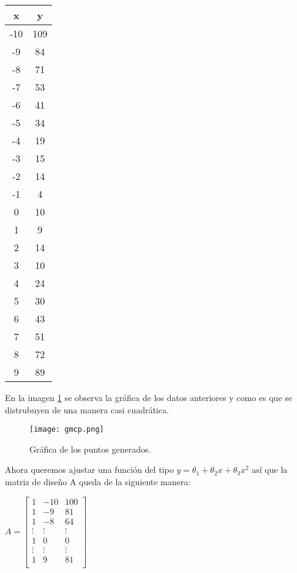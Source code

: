 \begin{center}
\begin{tabular}{|c|c| }
\hline
x & y \\
\hline
-10 & 109 \\
\hline
-9 & 84 \\
\hline
-8 & 71 \\ 
\hline  
-7 & 53 \\
\hline
-6 & 41 \\ 
\hline
-5 & 34 \\ 
\hline 
-4 & 19 \\ 
\hline 
-3 & 15 \\ 
\hline 
-2 & 14 \\
\hline   
-1 & 4 \\  
\hline 
0 & 10 \\ 
\hline   
1 & 9 \\
\hline
2 & 14 \\ 
\hline  
3 & 10 \\ 
\hline  
4 & 24 \\ 
\hline  
5 & 30 \\ 
\hline  
6 & 43 \\ 
\hline  
7 & 51 \\ 
\hline  
8 & 72 \\ 
\hline  
9 & 89 \\
\hline
\end{tabular}
\end{center}


En la imagen \ref{gpo} se observa la gráfica de los datos anteriores y como es que se distrubuyen de una manera casi cuadrática.

\begin{figure}
\centering
\texttt{[image: gmcp.png]}
\caption{Gráfica de los puntos generados.}\label{gpo}
\end{figure}

Ahora queremos ajustar una función del tipo $y = \theta_{1} + \theta_{2}x + \theta_{3}x^{2}$ así que la matriz de diseño A queda de la siguiente manera: 
	
\begin{center}
$ A = 
\begin{bmatrix}
1 & -10 & 100 \\
1 & -9 & 81 \\
1 & -8 & 64 \\
\vdots & \vdots & \vdots \\
1 & 0 & 0 \\
\vdots & \vdots & \vdots \\
1 & 9 & 81 \\
\end{bmatrix}
$
\end{center}

